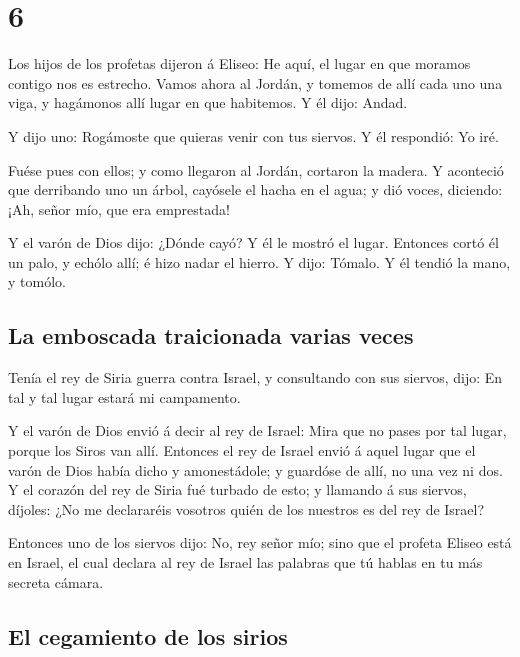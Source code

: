 \hypertarget{section-5}{%
\section{6}\label{section-5}}

 Los hijos de los profetas dijeron á Eliseo: He aquí, el
lugar en que moramos contigo nos es estrecho.  Vamos ahora
al Jordán, y tomemos de allí cada uno una viga, y hagámonos allí lugar
en que habitemos. Y él dijo: Andad.

 Y dijo uno: Rogámoste que quieras venir con tus siervos. Y
él respondió: Yo iré.

 Fuése pues con ellos; y como llegaron al Jordán, cortaron
la madera.  Y aconteció que derribando uno un árbol,
cayósele el hacha en el agua; y dió voces, diciendo: ¡Ah, señor mío, que
era emprestada!

 Y el varón de Dios dijo: ¿Dónde cayó? Y él le mostró el
lugar. Entonces cortó él un palo, y echólo allí; é hizo nadar el hierro.
 Y dijo: Tómalo. Y él tendió la mano, y tomólo.

\hypertarget{la-emboscada-traicionada-varias-veces}{%
\subsection{La emboscada traicionada varias
veces}\label{la-emboscada-traicionada-varias-veces}}

 Tenía el rey de Siria guerra contra Israel, y consultando
con sus siervos, dijo: En tal y tal lugar estará mi campamento.

 Y el varón de Dios envió á decir al rey de Israel: Mira que
no pases por tal lugar, porque los Siros van allí. 
Entonces el rey de Israel envió á aquel lugar que el varón de Dios había
dicho y amonestádole; y guardóse de allí, no una vez ni dos.
 Y el corazón del rey de Siria fué turbado de esto; y
llamando á sus siervos, díjoles: ¿No me declararéis vosotros quién de
los nuestros es del rey de Israel?

 Entonces uno de los siervos dijo: No, rey señor mío; sino
que el profeta Eliseo está en Israel, el cual declara al rey de Israel
las palabras que tú hablas en tu más secreta cámara.

\hypertarget{el-cegamiento-de-los-sirios}{%
\subsection{El cegamiento de los
sirios}\label{el-cegamiento-de-los-sirios}}

